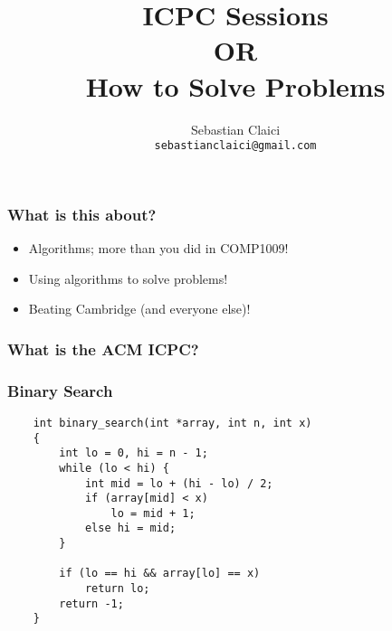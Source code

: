 \documentclass{beamer}
\title{ICPC Sessions \\
    OR \\
    How to Solve Problems
}
\author{Sebastian Claici \\
    \texttt{sebastianclaici@gmail.com}
}
\begin{document}
\maketitle

\begin{frame}
    \frametitle{What is this about?}
    \begin{itemize}
        \item Algorithms; more than you did in COMP1009!
            \pause
        \item Using algorithms to solve problems!
            \pause
        \item Beating Cambridge (and everyone else)!
    \end{itemize}
\end{frame}

\begin{frame}
    \frametitle{What is the ACM ICPC?}

\end{frame}

\begin{frame}[fragile]
    \frametitle{Binary Search}
    \lstset{language=C}
    \begin{lstlisting}
    int binary_search(int *array, int n, int x)
    {
        int lo = 0, hi = n - 1;
        while (lo < hi) {
            int mid = lo + (hi - lo) / 2;
            if (array[mid] < x)
                lo = mid + 1;
            else hi = mid;
        }

        if (lo == hi && array[lo] == x)
            return lo;
        return -1;
    }
    \end{lstlisting}
\end{frame}
\end{document}
